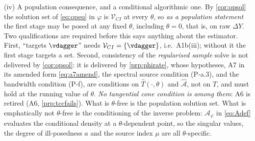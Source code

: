 \begin{remark}[R1]
(iv) A population consequence, and a conditional algorithmic one. By \cref{cor:opsol} the
solution set of \eqref{eq:opeq} in $\varphi$ is $\mathcal V_{CI}$ at every $\theta$, so \emph{as a
population statement} the first stage may be posed at any fixed $\theta$, including $\theta=0$, that is,
on raw $\Delta Y$. Two qualifications are required before this says anything about the estimator. First,
``targets $\vdagger$'' needs $\mathcal V_{CI}=\{\vdagger\}$, i.e.\ A1b(iii); without it the first stage
targets a set. Second, consistency of the \emph{regularised sample} solve is not delivered by
\cref{cor:opsol}: it is delivered by \cref{prp:phirate}, whose hypotheses, A7 in its amended form
\eqref{eq:a7amend}, the spectral source condition (P-a.3), and the bandwidth condition (P-f), are conditions on
$\hat T(\cdot,\theta)$ and $\hat{\mathcal A}$, not on $T$, and must hold at the running value of
$\theta$. \emph{No tangential cone condition is among them}: A6 is retired
(A6, \cref{prp:tccfails}). What is $\theta$-free is the population
solution set.
What is emphatically not $\theta$-free is the conditioning of the inverse problem: $\mathcal A_\varphi$
in \eqref{eq:Adef} evaluates the conditional density at a $\theta$-dependent point, so the singular
values, the degree of ill-posedness $a$ and the source index $\mu$ are all $\theta$-specific.
\end{remark}


